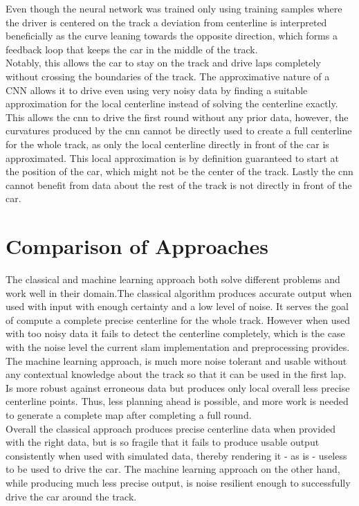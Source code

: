 Even though the neural network was trained only using training samples where the driver is centered on the track a deviation from centerline is interpreted beneficially as the curve leaning towards the opposite direction, which forms a feedback loop that keeps the car in the middle of the track.\\
Notably, this allows the car to stay on the track and drive laps completely without crossing the boundaries of the track. The approximative nature of a CNN allows it to drive even using very noisy data by finding a suitable approximation for the local centerline instead of solving the centerline exactly. This allows the \ac{cnn} to drive the first round without any prior data, however, the curvatures produced by the \ac{cnn} cannot be directly used to create a full centerline for the whole track, as only the local centerline directly in front of the car is approximated. This local approximation is by definition guaranteed to start at the position of the car, which might not be the center of the track. Lastly the \ac{cnn} cannot benefit from data about the rest of the track is not directly in front of the car.



\section{Comparison of Approaches}

The classical and machine learning approach both solve different problems and work well in their domain.The classical algorithm produces accurate output when used with input with enough certainty and a low level of noise. It serves the goal of compute a complete precise centerline for the whole track. However when used with too noisy data it fails to detect the centerline completely, which is the case with the noise level the current slam implementation and preprocessing provides. The machine learning approach, is much more noise tolerant and usable without any contextual knowledge about the track so that it can be used in the first lap. Is more robust against erroneous data but produces only local overall less precise centerline points. Thus, less planning ahead is possible, and more work is needed to generate a complete map after completing a full round.\\
Overall the classical approach produces precise centerline data when provided with the right data, but is so fragile that it fails to produce usable output consistently when used with simulated data, thereby rendering it - as is - useless to be used to drive the car. The machine learning approach on the other hand, while producing much less precise output, is noise resilient enough to successfully drive the car around the track.

